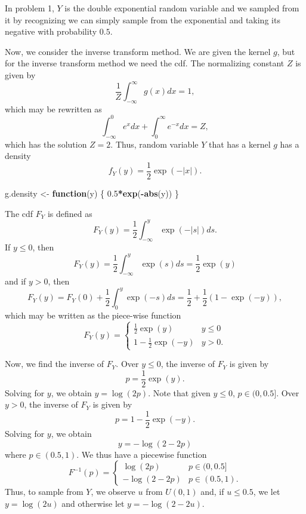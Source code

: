 \documentclass[
  11pt,
]{article}
\newenvironment{Shaded}{\begin{snugshade}}{\end{snugshade}}
\newcommand{\ControlFlowTok}[1]{\textcolor[rgb]{0.13,0.29,0.53}{\textbf{#1}}}
\newcommand{\FloatTok}[1]{\textcolor[rgb]{0.00,0.00,0.81}{#1}}
\newcommand{\FunctionTok}[1]{\textcolor[rgb]{0.13,0.29,0.53}{\textbf{#1}}}
\newcommand{\NormalTok}[1]{#1}
\newcommand{\OtherTok}[1]{\textcolor[rgb]{0.56,0.35,0.01}{#1}}
\newcommand{\SpecialCharTok}[1]{\textcolor[rgb]{0.81,0.36,0.00}{\textbf{#1}}}
\begin{document}
In problem 1, \(Y\) is the double exponential random variable and we
sampled from it by recognizing we can simply sample from the exponential
and taking its negative with probability \(0.5\).

Now, we consider the inverse transform method. We are given the kernel
\(g\), but for the inverse transform method we need the cdf. The
normalizing constant \(Z\) is given by \[
  \frac{1}{Z} \int_{-\infty}^{\infty} g(x) dx = 1,
\] which may be rewritten as \[
  \int_{-\infty}^{0} e^{x} dx + \int_{0}^{\infty} e^{-x} dx = Z,
\] which has the solution \(Z=2\). Thus, random variable \(Y\) that has
a kernel \(g\) has a density \[
  f_Y(y) = \frac{1}{2} \exp(-|x|).
\]

\begin{Shaded}
\begin{Highlighting}[]
\NormalTok{g.density }\OtherTok{\textless{}{-}} \ControlFlowTok{function}\NormalTok{(y) \{ }\FloatTok{0.5}\SpecialCharTok{*}\FunctionTok{exp}\NormalTok{(}\SpecialCharTok{{-}}\FunctionTok{abs}\NormalTok{(y)) \}}
\end{Highlighting}
\end{Shaded}

The cdf \(F_Y\) is defined as \[
  F_Y(y) = \frac{1}{2}\int_{-\infty}^{y} \exp(-|s|) ds.
\] If \(y \leq 0\), then \[
  F_Y(y) = \frac{1}{2} \int_{-\infty}^{y} \exp(s) ds = \frac{1}{2}\exp(y)
\] and if \(y > 0\), then \[
  F_Y(y) = F_Y(0) + \frac{1}{2} \int_{0}^{y} \exp(-s) ds = \frac{1}{2} + \frac{1}{2}(1 - \exp(-y)),
\] which may be written as the piece-wise function \[
  F_Y(y) =
  \begin{cases}
    \frac{1}{2} \exp(y)                & y \leq 0\\
    1 - \frac{1}{2} \exp(-y) & y > 0.
  \end{cases}
\]

Now, we find the inverse of \(F_Y\). Over \(y \leq 0\), the inverse of
\(F_Y\) is given by \[
  p = \frac{1}{2} \exp(y).
\] Solving for \(y\), we obtain \(y = \log(2p)\). Note that given
\(y \leq 0\), \(p \in (0,0.5]\). Over \(y > 0\), the inverse of \(F_Y\)
is given by \[
  p = 1 - \frac{1}{2} \exp(-y).
\] Solving for \(y\), we obtain \[
  y = -\log(2-2p)
\] where \(p \in (0.5,1)\). We thus have a piecewise function \[
  F^{-1}(p) =
  \begin{cases}
    \log(2p)        & p \in (0,0.5]\\
    -\log(2-2p)     & p \in (0.5,1).
  \end{cases}
\] Thus, to sample from \(Y\), we observe \(u\) from \(U(0,1)\) and, if
\(u \leq 0.5\), we let \(y = \log(2u)\) and otherwise let
\(y = -\log(2-2u)\).
\end{document}
